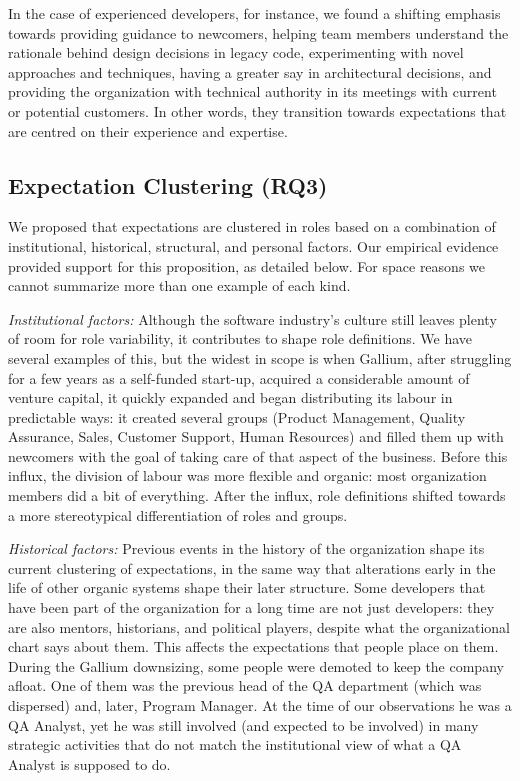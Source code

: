 \documentclass[10pt, conference, compsocconf]{IEEEtran}
\begin{document}
In the case of experienced developers, for instance, we found a shifting emphasis towards providing guidance to newcomers, helping team members understand the rationale behind design decisions in legacy code, experimenting with novel approaches and techniques, having a greater say in architectural decisions, and providing the organization with technical authority in its meetings with current or potential customers. In other words, they transition towards expectations that are centred on their experience and expertise.



\subsection{Expectation Clustering (RQ3)}

We proposed that expectations are clustered in roles based on a combination of institutional, historical, structural, and personal factors. Our empirical evidence provided support for this proposition, as detailed below. For space reasons we cannot summarize more than one example of each kind.

\emph{Institutional factors:} Although the software industry's culture still leaves plenty of room for role variability, it contributes to shape role definitions. We have several examples of this, but the widest in scope is when Gallium, after struggling for a few years as a self-funded start-up, acquired a considerable amount of venture capital, it quickly expanded and began distributing its labour in predictable ways: it created several groups (Product Management, Quality Assurance, Sales, Customer Support, Human Resources) and filled them up with newcomers with the goal of taking care of that aspect of the business. Before this influx, the division of labour was more flexible and organic: most organization members did a bit of everything. After the influx, role definitions shifted towards a more stereotypical differentiation of roles and groups.

\emph{Historical factors:} Previous events in the history of the organization shape its current clustering of expectations, in the same way that alterations early in the life of other organic systems shape their later structure. Some developers that have been part of the organization for a long time are not just developers: they are also mentors, historians, and political players, despite what the organizational chart says about them. This affects the expectations that people place on them. During the Gallium downsizing, some people were demoted to keep the company afloat. One of them was the previous head of the QA department (which was dispersed) and, later, Program Manager. At the time of our observations he was a QA Analyst, yet he was still involved (and expected to be involved) in many strategic activities that do not match the institutional view of what a QA Analyst is supposed to do.
\end{document}
